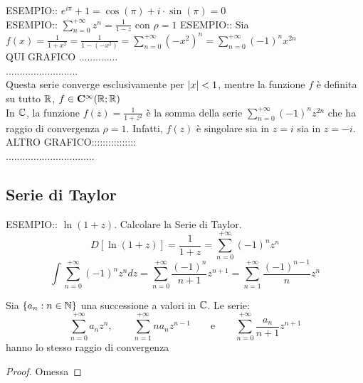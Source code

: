 ESEMPIO:: $e^{i\pi}+1=\cos(\pi)+i\cdot \sin(\pi)=0$\\
ESEMPIO:: $\sum\limits_{n=0}^{+\infty}z^n=\frac{1}{1-z}$ con $\rho=1$
ESEMPIO:: Sia $f(x)=\frac{1}{1+x^2}=\frac{1}{1-(-x^2)} = \sum\limits_{n=0}^{+\infty}(-x^2)^n=\sum\limits_{n=0}^{+\infty}(-1)^nx^{2n}$\\
QUI GRAFICO ..............\\
..........................\\
Questa serie converge esclusivamente per $\left|x\right|<1$, mentre la funzione $f$ è definita su tutto $ \mathbb{R}$, $f\in \mathbf{C^{\infty}}( \mathbb{R}; \mathbb{R})$\\
In $\mathbb{C}$, la funzione $f(z)=\frac{1}{1+z^2}$ è la somma della serie $\sum\limits_{n=0}^{+\infty}(-1)^nz^{2n}$ che ha raggio di convergenza  $\rho=1$. Infatti, $f(z)$ è singolare sia in $z=i$ sia in $z=-i$.\\
ALTRO GRAFICO::::::::::::::::\\
................................\\

\subsection{Serie di Taylor}
ESEMPIO:: $\ln(1+z)$. Calcolare la Serie di Taylor.
\[D\left[\ln(1+z)\right] = \frac{1}{1+z} = \sum\limits_{n=0}^{+\infty}(-1)^nz^n\]
\[\int \sum\limits_{n=0}^{+\infty}(-1)^nz^n dz = \sum\limits_{n=0}^{+\infty}\frac{(-1)^n}{n+1}z^{n+1}=\sum\limits_{n=1}^{+\infty}\frac{(-1)^{n-1}}{n}z^n\]
\begin{lemma}
	\label{lemma:taylor_rad_convergency}
	Sia $\left\{a_n:n \in \mathbb{N}\right\}$ una successione a valori in $\mathbb{C}$. Le serie:
	\[\sum_{n=0}^{+\infty} a_n z^n ,\qquad \sum_{n=1}^{+\infty} n a_n z^{n-1} \qquad\text{e}\qquad \sum_{n=0}^{+\infty} \frac{a_n}{n+1}z^{n+1}\]
	hanno lo stesso raggio di convergenza
	\begin{proof}
		Omessa
	\end{proof}
\end{lemma}

